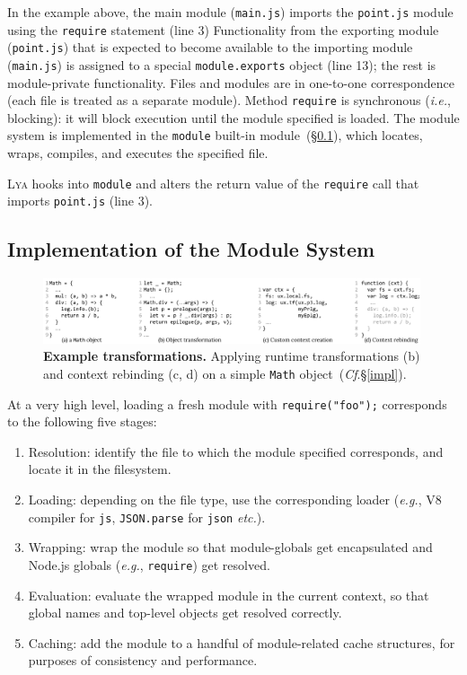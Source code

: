\documentclass[letterpaper,twocolumn,10pt]{article}
\def\eg{{\em e.g.}, }
\def\ie{{\em i.e.}, }
\def\etc{{\em etc.}\xspace}
\newcommand{\ttt}[1]{\texttt{#1}}
\newcommand{\cf}[1]{(\emph{Cf}.\S\ref{#1})}
\newcommand{\sx}[1]{(\S\ref{#1})}
\newcommand{\sys}{{\scshape Lya}\xspace}
\begin{document}
In the example above, the main module (\ttt{main.js}) imports the \ttt{point.js} module using the \ttt{require} statement (line 3)
Functionality from the exporting module (\ttt{point.js}) that is expected to become available to the importing module (\ttt{main.js}) is assigned to a special \ttt{module.exports} object (line 13);
  the rest is module-private functionality.
Files and modules are in one-to-one correspondence (each file is treated as a separate module).
Method \ttt{require} is synchronous (\ie blocking):
  it will block execution until the module specified is loaded.
The module system is implemented in the \ttt{module} built-in module~\sx{c}, which locates, wraps, compiles, and executes the specified file.

\sys hooks into \ttt{module} and alters the return value of the \ttt{require} call that imports \ttt{point.js} (line 3).

\subsection{Implementation of the Module System}
\label{c}

\begin{figure}[t]
\centering
\includegraphics[width=0.99\textwidth]{./figs/lya_ex.pdf}
\vspace{-2mm}
\caption{
  \textbf{Example transformations.}
   Applying runtime transformations (b) and context rebinding (c, d) on a simple \ttt{Math} object~\cf{impl}.
}
\label{fig:tx2}
\vspace{-2mm}
\end{figure}


At a very high level, loading a fresh module with \ttt{require("foo");} corresponds to the following five stages:

\begin{enumerate}
\item Resolution: identify the file to which the module specified corresponds, and locate it in the filesystem.
\item Loading: depending on the file type, use the corresponding loader (\eg V8 compiler for \ttt{js}, \ttt{JSON.parse} for \ttt{json} \etc).
\item Wrapping: wrap the module so that module-globals get encapsulated and Node.js globals (\eg \ttt{require}) get resolved.
\item Evaluation: evaluate the wrapped module in the current context, so that global names and top-level objects get resolved correctly.
\item Caching: add the module to a handful of module-related cache structures, for purposes of consistency and performance.
\end{enumerate}
\end{document}
